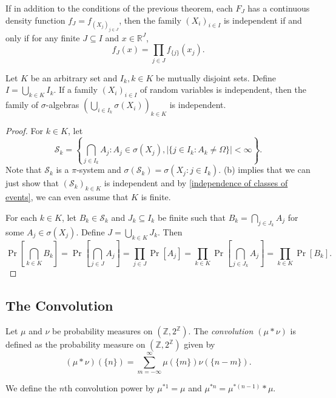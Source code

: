 \begin{corollary}
    If in addition to the conditions of the previous theorem, each $F_J$ has a continuous density function $f_J=f_{(X_j)_{j\in J}}$, then the family $(X_i)_{i\in I}$ is independent if and only if for any finite $J\subseteq I$ and $x\in\mathbb{R}^J$,
    $$f_J(x) = \prod_{j\in J}f_{\{j\}}(x_j).$$
\end{corollary}

\begin{ftheo}
\label{independent mutually disjoint set union}
    Let $K$ be an arbitrary set and $I_k,k\in K$ be mutually disjoint sets. Define $I=\bigcup_{k\in K}I_k$. If a family $(X_i)_{i\in I}$ of random variables is independent, then the family of $\sigma$-algebras $(\bigcup_{i\in I_k}\sigma(X_i))_{k\in K}$ is independent.
\end{ftheo}
\begin{proof}
    For $k\in K$, let
    $$\mathcal{S}_k=\left\{\bigcap_{j\in I_k}A_j : A_j\in\sigma(X_j), |\{j\in I_k:A_k\neq\Omega\}|<\infty \right\}.$$
    Note that $\mathcal{S}_k$ is a $\pi$-system and $\sigma(\mathcal{S}_k) = \sigma(X_j:j\in I_k)$. (b) implies that we can just show that $(\mathcal{S}_k)_{k\in K}$ is independent and by \cref{independence of classes of events}, we can even assume that $K$ is finite.
    
    For each $k\in K$, let $B_k\in\mathcal{S}_k$ and $J_k\subseteq I_k$ be finite such that $B_k=\bigcap_{j\in J_k} A_j$ for some $A_j\in\sigma(X_j)$. Define $J=\bigcup_{k\in K} J_k$. Then
    $$\Pr\left[\bigcap_{k\in K} B_k\right] = \Pr\left[\bigcap_{j\in J}A_j\right] = \prod_{j\in J}\Pr[A_j] = \prod_{k\in K}\Pr\left[\bigcap_{j\in J_k}A_j\right] = \prod_{k\in K}\Pr[B_k].$$
\end{proof}

\subsection{The Convolution}

\begin{definition}
    Let $\mu$ and $\nu$ be probability measures on $(\mathbb{Z},2^\mathbb{Z})$. The \textit{convolution $(\mu * \nu)$} is defined as the probability measure on $(\mathbb{Z},2^\mathbb{Z})$ given by
    $$(\mu * \nu) (\{n\}) = \sum_{m=-\infty}^\infty \mu(\{m\})\nu(\{n-m\}).$$
    
\end{definition}

We define the $n$th convolution power by $\mu^{*1}=\mu$ and $\mu^{*n}=\mu^{*(n-1)}*\mu$.

